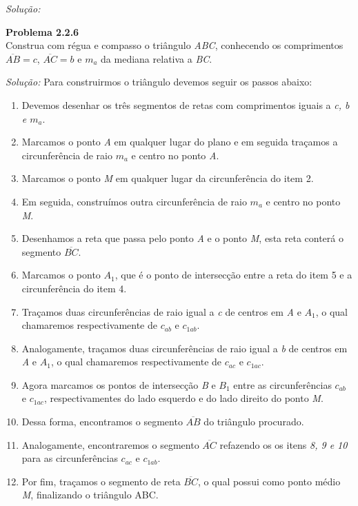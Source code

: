 \documentclass[a4paper, 11pt]{book}
\newenvironment{problem}[2][Problema] 
    { \begin{mdframed}[backgroundcolor=gray!20] \textbf{#1 #2} \\}
    {  \end{mdframed}}
\newenvironment{solution}
    {\textit{Solução:}}
    {}
\begin{document}
\begin{solution}
\begin{problem}{2.2.6}
    \label{prob:2.2.6}
    Construa com régua e compasso o triângulo \textit{ABC}, conhecendo os comprimentos $\overline{AB} = c$, $\overline{AC} = b$ e $m_{a}$ da mediana relativa a  \textit{BC}.  
\end{problem}
\begin{solution}
    Para construirmos o triângulo devemos seguir os passos abaixo:
    \begin{enumerate}[\textbf{\arabic*}:]
        \item Devemos desenhar os três segmentos de retas com comprimentos iguais a \textit{c, b e $m_{a}$}.
        \item Marcamos o ponto \textit{A} em qualquer lugar do plano e em seguida traçamos a circunferência de raio $m_{a}$ e centro no ponto \textit{A}.  
        \item Marcamos o ponto \textit{M} em qualquer lugar da circunferência do item 2. 
        \item Em seguida, construímos outra circunferência de raio $m_{a}$ e centro no ponto \textit{M}. 
        \item Desenhamos a reta que passa pelo ponto \textit{A} e o ponto \textit{M}, esta reta conterá o segmento $\overline{BC}$.  
        \item Marcamos o ponto  \textit{$A_{1}$}, que é o ponto de intersecção entre a reta do item 5 e a circunferência do item 4.
        \item Traçamos duas circunferências de raio igual a \textit{c} de centros em \textit{A} e \textit{$A_{1}$}, o qual chamaremos respectivamente de \textit{$c_{ab}$} e \textit{$c_{1ab}$}.   
        \item Analogamente, traçamos duas circunferências de raio igual a \textit{b} de centros em \textit{A} e \textit{$A_{1}$}, o qual chamaremos respectivamente de \textit{$c_{ac}$} e \textit{$c_{1ac}$}.  
        \item Agora marcamos os pontos de intersecção \textit{B} e \textit{$B_{1}$} entre as circunferências \textit{$c_{ab}$} e \textit{$c_{1ac}$}, respectivamentes do lado esquerdo e do lado direito do ponto \textit{M}.  
        \item Dessa forma, encontramos o segmento $\overline{AB}$ do triângulo procurado.
        \item Analogamente, encontraremos o segmento $\overline{AC}$ refazendo os os itens
            \textit{8, 9 e 10} para as circunferências $c_{ac}$ e  $c_{1ab}$. 
        \item Por fim, traçamos o segmento de reta $\overline{BC}$, o qual possui como ponto médio \textit{M}, finalizando o triângulo ABC. 

\end{enumerate}
\end{solution}
\end{solution}
\end{document}
